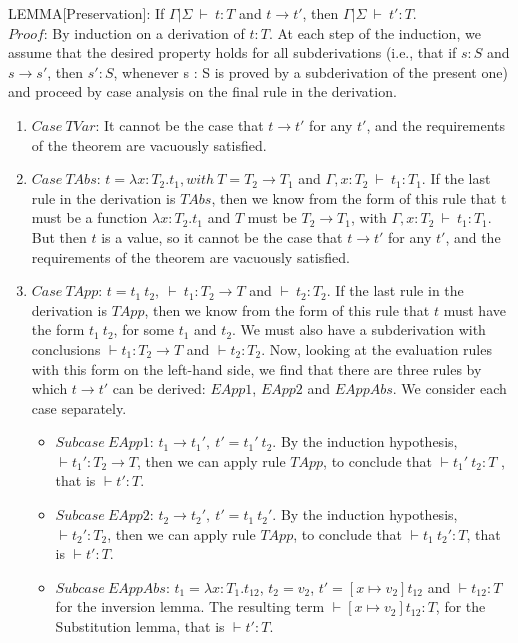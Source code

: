 \documentclass [proof]{article}
\newcommand{\tto}{\longrightarrow}
\newcommand{\env}{{\Gamma | \Sigma \ \vdash}}
\begin{document}
LEMMA[Preservation]: If $\env \ t : T$ and $t \tto t'$, then $\env \ t' : T$.\\
$Proof$: By induction on a derivation of $t : T$. At each step of the induction, we assume that the desired property holds for all subderivations (i.e., that if $s : S$ and $s \tto s'$, then $s' : S$, whenever s : S is proved by a subderivation of the present one) and proceed by case analysis on the final rule in the derivation.
\begin{enumerate}
\item $Case \ TVar$: It cannot be the case that $t \tto t'$ for any $t'$, and the requirements of the theorem are vacuously satisfied.
\item $Case \ TAbs$: $t = \lambda x:T_2.t_1, with \ T = T_2 \to T_1$ and $ \Gamma, x:T_2 \ \vdash \ t_1 : T_1$. If the last rule in the derivation is $TAbs$, then we know from the form of this rule that t must be a function $\lambda x:T_2.t_1$ and $T$ must be $T_2 \to T_1$, with $ \Gamma, x:T_2 \ \vdash \ t_1 : T_1$. But then $t$ is a value, so it cannot be the case that $t \tto t'$ for any $t'$, and the requirements of the theorem are vacuously satisfied.
\item $Case \ TApp$: $t = t_1 \ t_2, \ \vdash \ t_1 : T_2 \to T$ and $\vdash \ t_2 : T_2$. If the last rule in the derivation is $TApp$, then we know from the form of this rule that $t$ must have the form $t_1 \ t_2$, for some $t_1$ and $t_2$. We must also have a subderivation with conclusions $\vdash t_1 : T_2 \to T$ and $\vdash t_2 : T_2$. Now, looking at the evaluation rules with this form on the left-hand side, we find that there are three rules by which $t \tto t'$ can be derived: $EApp1$, $EApp2$ and $EAppAbs$. We consider each case separately.
\begin{itemize}
\item $Subcase \ EApp1$: $t_1 \tto t_1', \ t' = t_1' \ t_2$. By the induction hypothesis, $\vdash t_1' : T_2 \to T$, then we can apply rule $TApp$, to conclude that $\vdash t_1' \ t_2: T$ , that is $\vdash t' : T$.
\item $Subcase \ EApp2$: $t_2 \tto t_2', \ t' = t_1 \ t_2'$. By the induction hypothesis, $\vdash t_2' : T_2 $, then we can apply rule $TApp$, to conclude that $\vdash t_1 \ t_2' : T$, that is $\vdash t' : T$.
\item $Subcase \ EAppAbs$: $t_1 = \lambda x:T_{1}.t_{12}$, $t_2 = v_2$, $t' = [x \mapsto v_2]t_{12}$ and $\vdash t_{12}: T$ for the inversion lemma. The resulting term $\vdash [x \mapsto v_2]t_{12}:T$, for the Substitution lemma, that is $\vdash t' : T$.
\end{itemize}



\end{enumerate}
\end{document}
